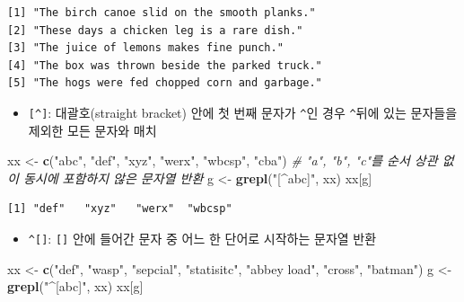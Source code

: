 \documentclass[
  11pt,
]{krantz}
\newenvironment{Shaded}{\begin{snugshade}}{\end{snugshade}}
\newcommand{\CommentTok}[1]{\textcolor[rgb]{0.37,0.37,0.37}{\textit{#1}}}
\newcommand{\KeywordTok}[1]{\textcolor[rgb]{0.27,0.27,0.27}{\textbf{#1}}}
\newcommand{\NormalTok}[1]{#1}
\newcommand{\StringTok}[1]{\textcolor[rgb]{0.5,0.5,0.5}{#1}}
\providecommand{\tightlist}{%
  \setlength{\itemsep}{0pt}\setlength{\parskip}{0pt}}
\begin{document}
\begin{verbatim}
[1] "The birch canoe slid on the smooth planks." 
[2] "These days a chicken leg is a rare dish."   
[3] "The juice of lemons makes fine punch."      
[4] "The box was thrown beside the parked truck."
[5] "The hogs were fed chopped corn and garbage."
\end{verbatim}

\normalsize

\begin{itemize}
\tightlist
\item
  \texttt{{[}\^{}{]}}: 대괄호(straight bracket) 안에 첫 번째 문자가 \texttt{\^{}}인 경우 \texttt{\^{}}뒤에 있는 문자들을 제외한 모든 문자와 매치
\end{itemize}

\footnotesize

\begin{Shaded}
\begin{Highlighting}[]
\NormalTok{xx <-}\StringTok{ }\KeywordTok{c}\NormalTok{(}\StringTok{"abc"}\NormalTok{, }\StringTok{"def"}\NormalTok{, }\StringTok{"xyz"}\NormalTok{, }\StringTok{"werx"}\NormalTok{, }\StringTok{"wbcsp"}\NormalTok{, }\StringTok{"cba"}\NormalTok{)}
\CommentTok{# "a", "b", "c"를 순서 상관 없이 동시에 포함하지 않은 문자열 반환}
\NormalTok{g <-}\StringTok{ }\KeywordTok{grepl}\NormalTok{(}\StringTok{"[^abc]"}\NormalTok{, xx)}
\NormalTok{xx[g]}
\end{Highlighting}
\end{Shaded}

\begin{verbatim}
[1] "def"   "xyz"   "werx"  "wbcsp"
\end{verbatim}

\normalsize

\begin{itemize}
\tightlist
\item
  \texttt{\^{}{[}{]}}: \texttt{{[}{]}} 안에 들어간 문자 중 어느 한 단어로 시작하는 문자열 반환
\end{itemize}

\footnotesize

\begin{Shaded}
\begin{Highlighting}[]
\NormalTok{xx <-}\StringTok{ }\KeywordTok{c}\NormalTok{(}\StringTok{"def"}\NormalTok{, }\StringTok{"wasp"}\NormalTok{, }\StringTok{"sepcial"}\NormalTok{, }\StringTok{"statisitc"}\NormalTok{, }\StringTok{"abbey load"}\NormalTok{, }\StringTok{"cross"}\NormalTok{, }\StringTok{"batman"}\NormalTok{)}
\NormalTok{g <-}\StringTok{ }\KeywordTok{grepl}\NormalTok{(}\StringTok{"^[abc]"}\NormalTok{, xx)}
\NormalTok{xx[g]}
\end{Highlighting}
\end{Shaded}
\end{document}
